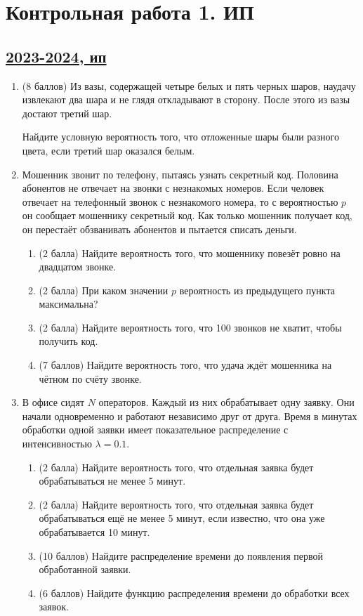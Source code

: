 \newpage
\thispagestyle{empty}
\section{Контрольная работа 1. ИП}


\subsection[2023-2024, ип]{\hyperref[sec:sol_kr_01_ip_2023_2024]{2023-2024, ип}}
\label{sec:kr_01_ip_2023_2024}

\begin{enumerate}
\item (8 баллов) Из вазы, содержащей четыре белых и пять черных шаров, наудачу извлекают два шара и не глядя откладывают в сторону. 
После этого из вазы достают третий шар. 

Найдите условную вероятность того, что отложенные шары были разного цвета, если третий шар оказался белым. 

\item Мошенник звонит по телефону, пытаясь узнать секретный код. 
Половина абонентов не отвечает на звонки с незнакомых номеров. 
Если человек отвечает на телефонный звонок с незнакомого номера, то с вероятностью $p$ он сообщает мошеннику секретный код. 
Как только мошенник получает код, он перестаёт обзванивать абонентов и пытается списать деньги. 
\begin{enumerate}
\item (2 балла) Найдите вероятность того, что мошеннику повезёт ровно на двадцатом звонке.
\item (2 балла) При каком значении $p$ вероятность из предыдущего пункта максимальна?
\item (2 балла) Найдите вероятность того, что 100 звонков не хватит, чтобы получить код.
\item (7 баллов) Найдите вероятность того, что удача ждёт мошенника на чётном по счёту звонке.
\end{enumerate}

\item В офисе сидят $N$ операторов. 
Каждый из них обрабатывает одну заявку. 
Они начали одновременно и работают независимо друг от друга. 
Время в минутах обработки одной заявки имеет показательное распределение с интенсивностью $\lambda = 0.1$. 
\begin{enumerate}
\item (2 балла) Найдите вероятность того, что отдельная заявка будет обрабатываться не менее 5 минут.
\item (2 балла) Найдите вероятность того, что отдельная заявка будет обрабатываться ещё не менее 5 минут, 
если известно, что она уже обрабатывается 10 минут.
\item (10 баллов) Найдите распределение времени до появления первой обработанной заявки.
\item (6 баллов) Найдите функцию распределения времени до обработки всех заявок.
\end{enumerate}



\end{enumerate}
